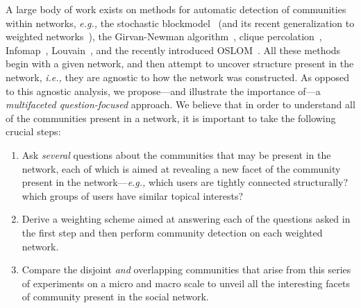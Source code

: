 A large body of work exists on methods for automatic detection of communities within networks, {\it e.g.,} the stochastic blockmodel~\cite{Holland1983} (and its recent generalization to weighted networks~\cite{Aicher26062014}), the Girvan-Newman algorithm~\cite{newman2004finding}, clique percolation~\cite{PalEtAl05}, Infomap~\cite{Rosvall08mapsof}, Louvain~\cite{blondel2008fast}, and the recently introduced OSLOM~\cite{LancichinettiPlos}.
All these methods begin with a given network, and then attempt to uncover structure present in the network, \emph{i.e.,} they are agnostic to how the network was constructed. As opposed to this agnostic analysis, we propose---and illustrate the importance of---a \emph{multifaceted question-focused} approach. We believe that in order to understand all of the communities present in a network, it is important to take the following crucial steps: 
\begin{enumerate}

\item Ask \emph{several} questions about the communities that may be present in the network, each of which is aimed at revealing a new facet of the community present in the network---{\it e.g.,} which users are tightly connected structurally? which groups of users have similar topical interests?

\item Derive a weighting scheme aimed at answering each of the questions asked in the first step and then perform community detection on each weighted network.
\item Compare the disjoint \emph{and} overlapping communities that arise from this series of experiments on a micro and macro scale to unveil all the interesting facets of community present in the social network. 
\end{enumerate}

